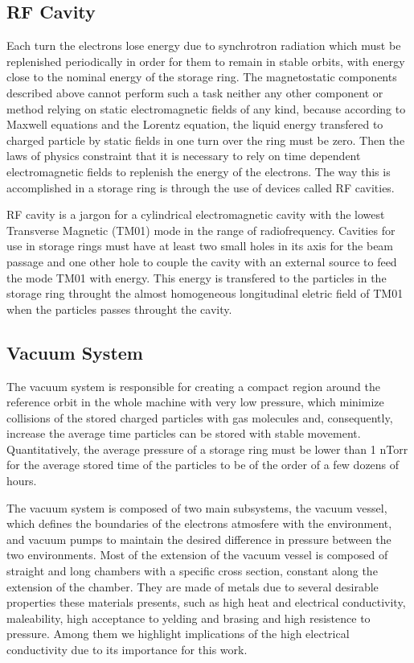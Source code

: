 \documentclass[
	12pt,				%
	openright,			%
	oneside,			%
	a4paper,		%
	chapter=TITLE,		%
	section=TITLE,		%
    brazil,				%
	english,			%
	sumario=tradicional,
	]{abntex2}
\begin{document}
    \subsection{RF Cavity}

    Each turn the electrons lose energy due to synchrotron radiation which must be replenished periodically in order for them to remain in stable orbits, with energy close to the nominal energy of the storage ring. The magnetostatic components described above cannot perform such a task neither any other component or method relying on static electromagnetic fields of any kind, because according to Maxwell equations and the Lorentz equation, the liquid energy transfered to charged particle by static fields in one turn over the ring must be zero. Then the laws of physics constraint that it is necessary to rely on time dependent electromagnetic fields to replenish the energy of the electrons. The way this is accomplished in a storage ring is through the use of devices called RF cavities.

    RF cavity is a jargon for a cylindrical electromagnetic cavity with the lowest Transverse Magnetic (TM01) mode in the range of radiofrequency. Cavities for use in storage rings must have at least two small holes in its axis for the beam passage and one other hole to couple the cavity with an external source to feed the mode TM01 with energy. This energy is transfered to the particles in the storage ring throught the almost homogeneous longitudinal eletric field of TM01 when the particles passes throught the cavity.

    \subsection{Vacuum System}

    The vacuum system is responsible for creating a compact region around the reference orbit in the whole machine with very low pressure, which minimize collisions of the stored charged particles with gas molecules and, consequently, increase the average time particles can be stored with stable movement. Quantitatively, the average pressure of a storage ring must be lower than 1 nTorr for the average stored time of the particles to be of the order of a few dozens of hours.

    The vacuum system is composed of two main subsystems, the vacuum vessel, which defines the boundaries of the electrons atmosfere with the environment, and vacuum pumps to maintain the desired difference in pressure between the two environments. Most of the extension of the vacuum vessel is composed of straight and long chambers with a specific cross section, constant along the extension of the chamber. They are made of metals due to several desirable properties these materials presents, such as high heat and electrical conductivity, maleability, high acceptance to yelding and brasing and high resistence to pressure. Among them we highlight implications of the high electrical conductivity due to its importance for this work.
\end{document}
